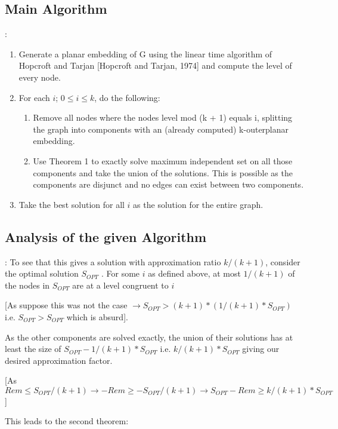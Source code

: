 \documentclass{beamer}
\begin{document}
\subsection{Main Algorithm}
\begin{frame}{\secname : \subsecname}
    \begin{enumerate}
        \item Generate a planar embedding of G using the linear time algorithm of Hopcroft and Tarjan [Hopcroft
        and Tarjan, 1974] and compute the level of every
        node.
        \item For each $i$; $0 \leq i \leq k$, do the following:
        \begin{enumerate}
        \item Remove all nodes where the nodes level
        mod (k + 1) equals i, splitting the graph into
        components with an (already computed) k-outerplanar embedding.
        \item Use Theorem 1 to exactly solve maximum independent set on all those components and
        take the union of the solutions. This is possible as the components are disjunct and no
        edges can exist between two components.
        \end{enumerate}
        \item Take the best solution for all $i$ as the solution for
        the entire graph.
    \end{enumerate}
\end{frame}
\subsection{Analysis of the given Algorithm}
\begin{frame}{\secname : \subsecname}
    To see that this gives a solution with approximation ratio
$k/(k + 1)$, consider the optimal solution $S_{OPT}$ . For some $i$
as defined above, at most $1/(k + 1)$ of the nodes in $S_{OPT}$
are at a level congruent to $i$ 

[As suppose this was not the case $\rightarrow S_{OPT} > (k + 1) * (1/(k + 1) * S_{OPT})$ i.e. $S_{OPT} > S_{OPT}$ which is absurd]. 

As the other components
are solved exactly, the union of their solutions has at least
the size of $S_{OPT} - 1/(k + 1) * S_{OPT}$ i.e. $k/(k + 1) * S_{OPT}$ giving our desired approximation factor. 

[As $Rem \leq S_{OPT}/(k + 1) \rightarrow -Rem \geq -S_{OPT}/(k + 1) \rightarrow S_{OPT} - Rem \geq k/(k+1)*S_{OPT}$]

This leads to the second theorem:
\end{frame}
\end{document}
